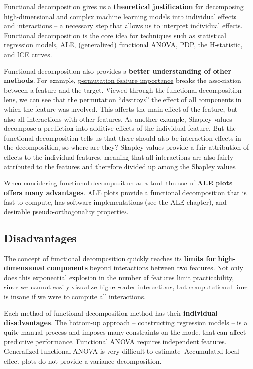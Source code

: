 \documentclass[
  11pt,
]{scrbook}
\begin{document}
Functional decomposition gives us a \textbf{theoretical justification} for decomposing high-dimensional and complex machine learning models into individual effects and interactions -- a necessary step that allows us to interpret individual effects.
Functional decomposition is the core idea for techniques such as statistical regression models, ALE, (generalized) functional ANOVA, PDP, the H-statistic, and ICE curves.

Functional decomposition also provides a \textbf{better understanding of other methods}.
For example, \protect\hyperlink{feature-importance}{permutation feature importance} breaks the association between a feature and the target.
Viewed through the functional decomposition lens, we can see that the permutation ``destroys'' the effect of all components in which the feature was involved.
This affects the main effect of the feature, but also all interactions with other features.
As another example, Shapley values decompose a prediction into additive effects of the individual feature.
But the functional decomposition tells us that there should also be interaction effects in the decomposition, so where are they?
Shapley values provide a fair attribution of effects to the individual features, meaning that all interactions are also fairly attributed to the features and therefore divided up among the Shapley values.

When considering functional decomposition as a tool, the use of \textbf{ALE plots offers many advantages}.
ALE plots provide a functional decomposition that is fast to compute, has software implementations (see the ALE chapter), and desirable pseudo-orthogonality properties.

\hypertarget{disadvantages-8}{%
\subsection{Disadvantages}\label{disadvantages-8}}

The concept of functional decomposition quickly reaches its \textbf{limits for high-dimensional components} beyond interactions between two features.
Not only does this exponential explosion in the number of features limit practicability, since we cannot easily visualize higher-order interactions, but computational time is insane if we were to compute all interactions.

Each method of functional decomposition method has their \textbf{individual disadvantages}.
The bottom-up approach -- constructing regression models -- is a quite manual process and imposes many constraints on the model that can affect predictive performance.
Functional ANOVA requires independent features.
Generalized functional ANOVA is very difficult to estimate.
Accumulated local effect plots do not provide a variance decomposition.
\end{document}
